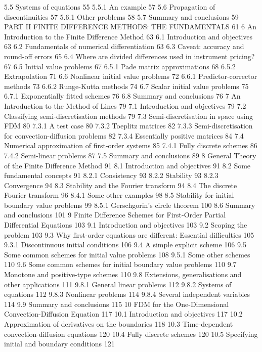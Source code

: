 5.5 Systems of equations 55
5.5.1 An example 57
5.6 Propagation of discontinuities 57
5.6.1 Other problems 58
5.7 Summary and conclusions 59
PART II FINITE DIFFERENCE METHODS: THE FUNDAMENTALS 61
6 An Introduction to the Finite Difference Method 63
6.1 Introduction and objectives 63
6.2 Fundamentals of numerical differentiation 63
6.3 Caveat: accuracy and round-off errors 65
6.4 Where are divided differences used in instrument pricing? 67
6.5 Initial value problems 67
6.5.1 Pade matrix approximations 68
6.5.2 Extrapolation 71
6.6 Nonlinear initial value problems 72
6.6.1 Predictor-corrector methods 73
6.6.2 Runge-Kutta methods 74
6.7 Scalar initial value problems 75
6.7.1 Exponentially fitted schemes 76
6.8 Summary and conclusions 76
7 An Introduction to the Method of Lines 79
7.1 Introduction and objectives 79
7.2 Classifying semi-discretisation methods 79
7.3 Semi-discretisation in space using FDM 80
7.3.1 A test case 80
7.3.2 Toeplitz matrices 82
7.3.3 Semi-discretisation for convection-diffusion problems 82
7.3.4 Essentially positive matrices 84
7.4 Numerical approximation of first-order systems 85
7.4.1 Fully discrete schemes 86
7.4.2 Semi-linear problems 87
7.5 Summary and conclusions 89
8 General Theory of the Finite Difference Method 91
8.1 Introduction and objectives 91
8.2 Some fundamental concepts 91
8.2.1 Consistency 93
8.2.2 Stability 93
8.2.3 Convergence 94
8.3 Stability and the Fourier transform 94
8.4 The discrete Fourier transform 96
8.4.1 Some other examples 98
8.5 Stability for initial boundary value problems 99
8.5.1 Gerschgorin's circle theorem 100
8.6 Summary and conclusions 101
9 Finite Difference Schemes for First-Order Partial Differential Equations 103
9.1 Introduction and objectives 103
9.2 Scoping the problem 103
9.3 Why first-order equations are different: Essential difficulties 105
9.3.1 Discontinuous initial conditions 106
9.4 A simple explicit scheme 106
9.5 Some common schemes for initial value problems 108
9.5.1 Some other schemes 110
9.6 Some common schemes for initial boundary value problems 110
9.7 Monotone and positive-type schemes 110
9.8 Extensions, generalisations and other applications 111
9.8.1 General linear problems 112
9.8.2 Systems of equations 112
9.8.3 Nonlinear problems 114
9.8.4 Several independent variables 114
9.9 Summary and conclusions 115
10 FDM for the One-Dimensional Convection-Diffusion Equation 117
10.1 Introduction and objectives 117
10.2 Approximation of derivatives on the boundaries 118
10.3 Time-dependent convection-diffusion equations 120
10.4 Fully discrete schemes 120
10.5 Specifying initial and boundary conditions 121
